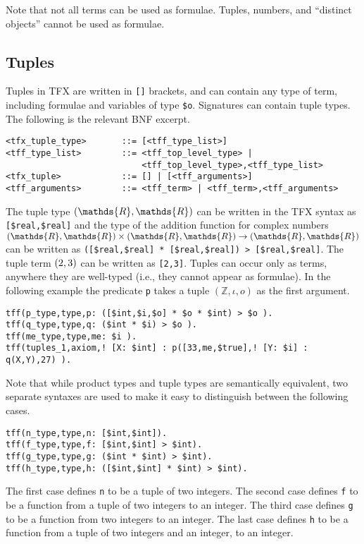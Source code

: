 \documentclass{easychair}
\begin{document}
Note that not all terms can be used as formulae.
Tuples, numbers, and ``distinct objects'' cannot be used as formulae.

\subsection{Tuples}

Tuples in TFX are written in {\tt []} brackets, and can contain any type of 
term, including formulae and variables of type {\tt \$o}. 
Signatures can contain tuple types. 
The following is the relevant BNF excerpt.
\begin{verbatim}
<tfx_tuple_type>       ::= [<tff_type_list>]
<tff_type_list>        ::= <tff_top_level_type> |
                           <tff_top_level_type>,<tff_type_list>
<tfx_tuple>            ::= [] | [<tff_arguments>]
<tff_arguments>        ::= <tff_term> | <tff_term>,<tff_arguments>
\end{verbatim}

The tuple type $\tuple{\mathds{R},\mathds{R}}$ can be written in the TFX 
syntax as \verb|[$real,$real]| and the type of the addition function for 
complex numbers $\tuple{\mathds{R},\mathds{R}} \times 
\tuple{\mathds{R},\mathds{R}} \to \tuple{\mathds{R},\mathds{R}}$ can be 
written as \verb'([$real,$real] * [$real,$real]) > [$real,$real]'. 
The tuple term $({2,3})$ can be written as \verb'[2,3]'.
Tuples can occur only as terms, anywhere they are well-typed (i.e., they
cannot appear as formulae). In the following example the predicate \verb|p|
takes a tuple $(\mathds{Z},\iota,o)$ as the first argument.
\begin{verbatim}
tff(p_type,type,p: ([$int,$i,$o] * $o * $int) > $o ).
tff(q_type,type,q: ($int * $i) > $o ).
tff(me_type,type,me: $i ).
tff(tuples_1,axiom,! [X: $int] : p([33,me,$true],! [Y: $i] : q(X,Y),27) ).
\end{verbatim}

Note that while product types and tuple types are semantically equivalent,
two separate syntaxes are used to make it easy to distinguish 
between the following cases.
\begin{verbatim}
tff(n_type,type,n: [$int,$int]).
tff(f_type,type,f: [$int,$int] > $int).
tff(g_type,type,g: ($int * $int) > $int).
tff(h_type,type,h: ([$int,$int] * $int) > $int).
\end{verbatim}

The first case defines \verb|n| to be a tuple of two integers.
The second case defines \verb|f| to be a function from a tuple of two integers
to an integer.
The third case defines \verb|g| to be a function from two integers to an integer.
The last case defines \verb|h| to be a function from a tuple of two integers and
an integer, to an integer.
\end{document}
